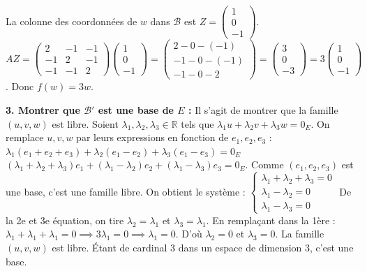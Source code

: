 \documentclass{report}
\begin{document}
La colonne des coordonnées de $w$ dans $\mathcal{B}$ est $Z = \begin{pmatrix} 1 \\ 0 \\ -1 \end{pmatrix}$.
$AZ = \begin{pmatrix} 2 & -1 & -1 \\ -1 & 2 & -1 \\ -1 & -1 & 2 \end{pmatrix} \begin{pmatrix} 1 \\ 0 \\ -1 \end{pmatrix} = \begin{pmatrix} 2-0-(-1) \\ -1-0-(-1) \\ -1-0-2 \end{pmatrix} = \begin{pmatrix} 3 \\ 0 \\ -3 \end{pmatrix} = 3 \begin{pmatrix} 1 \\ 0 \\ -1 \end{pmatrix}$.
Donc $f(w) = 3w$.

\textbf{3. Montrer que $\mathcal{B}'$ est une base de $E$ :}
Il s'agit de montrer que la famille $(u, v, w)$ est libre. Soient $\lambda_1, \lambda_2, \lambda_3 \in \mathbb{R}$ tels que $\lambda_1 u + \lambda_2 v + \lambda_3 w = 0_E$.
On remplace $u, v, w$ par leurs expressions en fonction de $e_1, e_2, e_3$ :
$\lambda_1(e_1+e_2+e_3) + \lambda_2(e_1-e_2) + \lambda_3(e_1-e_3) = 0_E$
$(\lambda_1+\lambda_2+\lambda_3)e_1 + (\lambda_1-\lambda_2)e_2 + (\lambda_1-\lambda_3)e_3 = 0_E$.
Comme $(e_1, e_2, e_3)$ est une base, c'est une famille libre. On obtient le système :
$\begin{cases} \lambda_1 + \lambda_2 + \lambda_3 = 0 \\ \lambda_1 - \lambda_2 = 0 \\ \lambda_1 - \lambda_3 = 0 \end{cases}$
De la 2e et 3e équation, on tire $\lambda_2 = \lambda_1$ et $\lambda_3 = \lambda_1$.
En remplaçant dans la 1ère : $\lambda_1 + \lambda_1 + \lambda_1 = 0 \implies 3\lambda_1 = 0 \implies \lambda_1 = 0$.
D'où $\lambda_2 = 0$ et $\lambda_3 = 0$.
La famille $(u, v, w)$ est libre. Étant de cardinal 3 dans un espace de dimension 3, c'est une base.
\end{document}
